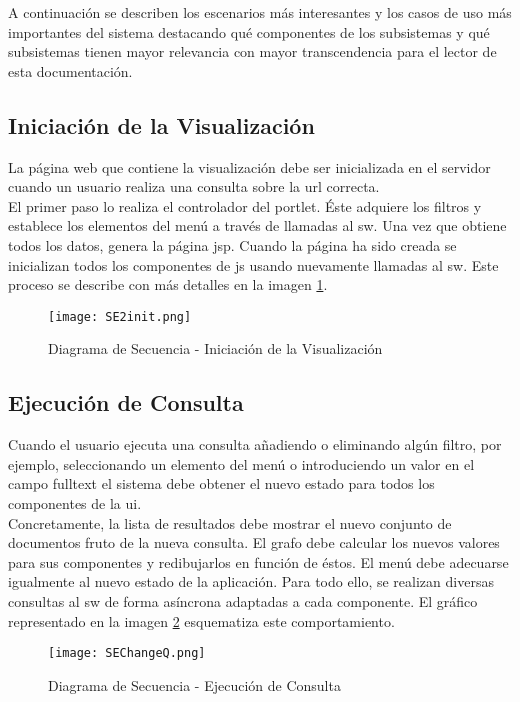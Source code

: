 A continuación se describen los escenarios más interesantes y los casos de uso más importantes del sistema destacando qué componentes de los subsistemas y qué subsistemas tienen mayor relevancia con mayor transcendencia para el lector de esta documentación.

\subsection{Iniciación de la Visualización}
La página web que contiene la visualización debe ser inicializada en el servidor cuando un usuario realiza una consulta sobre la \gls{url} correcta.\\

El primer paso lo realiza el controlador del \gls{portlet}. Éste adquiere los filtros y establece los elementos del menú a través de llamadas al \gls{sw}. Una vez que obtiene todos los datos, genera la página \gls{jsp}. Cuando la página ha sido creada se inicializan todos los componentes de \gls{js} usando nuevamente llamadas al \gls{sw}. Este proceso se describe con más detalles en la imagen \ref{image:runtime-init}.


\begin{figure}[H]
  \centering
  	\texttt{[image: SE2init.png]}
  \caption{Diagrama de Secuencia - Iniciación de la Visualización}
  \label{image:runtime-init}
\end{figure}

\subsection{Ejecución de Consulta}
Cuando el usuario ejecuta una consulta añadiendo o eliminando algún filtro, por ejemplo, seleccionando un elemento del menú o introduciendo un valor en el campo \gls{fulltext} el sistema debe obtener el nuevo estado para todos los componentes de la \gls{ui}.\\

Concretamente, la lista de resultados debe mostrar el nuevo conjunto de documentos fruto de la nueva consulta. El grafo debe calcular los nuevos valores para sus componentes y redibujarlos en función de éstos. El menú debe adecuarse igualmente al nuevo estado de la aplicación. Para todo ello, se realizan diversas consultas al \gls{sw} de forma asíncrona adaptadas a cada componente. El gráfico representado en la imagen \ref{image:runtime-query} esquematiza este comportamiento.

\begin{figure}[H]
  \centering
  	\texttt{[image: SEChangeQ.png]}
  \caption{Diagrama de Secuencia - Ejecución de Consulta}
  \label{image:runtime-query}
\end{figure}

